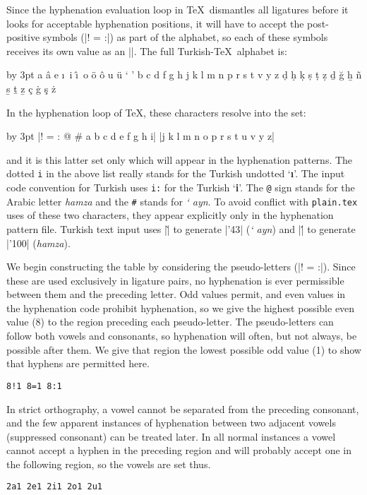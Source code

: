 Since the hyphenation evaluation loop in \TeX\ dismantles all ligatures
before it looks for acceptable hyphenation positions, it will have
to accept the post-positive symbols (|! = :|) as part of the alphabet,
so each of these symbols receives its own value as an |\lccode|.
The full Turkish-\TeX\ alphabet is:

{\advance\baselineskip by 3pt
\obeylines
a \^a e \i\ i \^\i\ o \"o \^o u \"u
` ' b c d f g h j k l m n p r s t v y z
\d d \d h \d k \d s \d t \d z
\b d \u g \b h \~n \b s \b t \b z
\c c \.g \c s \.z
\par }
\smallskip
In the hyphenation loop of \TeX, these characters resolve into
the set:

{\advance\baselineskip by 3pt
\obeylines
|! = : @ # a b c d e f g h i|
|j k l m n o p r s t u v y z|
\par }
\smallskip
\noindent and it is this latter set only which will appear in the
hyphenation patterns.  The dotted {\tt i} in the above list really
stands for the Turkish undotted `{\bf\i}'.  The input code convention
for Turkish uses {\tt i:} for the Turkish `{\bf i}'.  The {\tt @}
sign stands for the Arabic letter {\it hamza} and the {\tt \#}
stands for {\it `\kern-1.5pt ayn}.  To avoid conflict with
{\tt plain.tex} uses of these two characters, they appear explicitly
only in the hyphenation pattern file.  Turkish text input uses
|\`| to generate |\char'43| ({\it `\kern-1.5pt ayn}) and |\'|
to generate |\char'100| ({\it hamza}).

We begin constructing the table by considering the pseudo-letters
(|! = :|).  Since these are used exclusively in ligature pairs,
no hyphenation is ever permissible between them and the preceding
letter.  Odd values permit, and even values in the hyphenation 
code prohibit hyphenation,
so we give the highest possible even value (8) to the region
preceding each pseudo-letter.  The pseudo-letters can follow
both vowels and consonants, so hyphenation will often, but not
always, be possible after them.  We give that region the lowest
possible odd value (1) to show that hyphens are permitted here.
\smallskip
\centerline{\tt 8!1 8=1 8:1}
\smallskip

In strict orthography, a vowel cannot be separated from the
preceding consonant, and the few apparent instances of hyphenation
between two adjacent vowels (suppressed consonant) can be treated later.
In all normal instances a vowel cannot accept a hyphen in the
preceding region and will probably accept one in the following region,
so the vowels are set thus.
\smallskip
\centerline{\tt 2a1 2e1 2i1 2o1 2u1}
\smallskip

